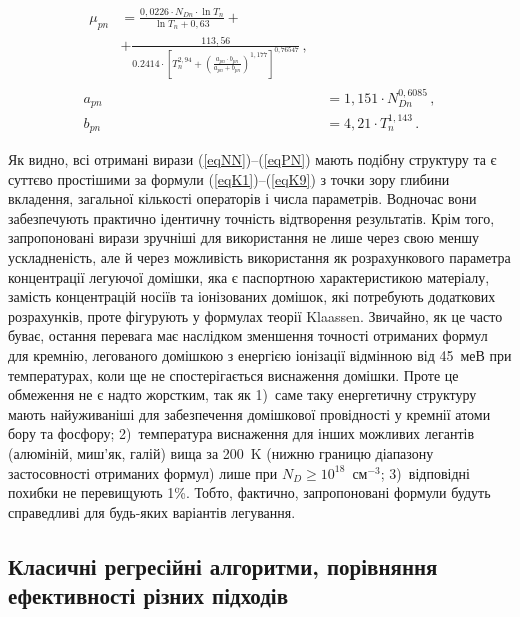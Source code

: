 \documentclass[fleqn,twoside,twocolumn,nofootinbib,showkeys]{revtex4} %
\begin{document}
\begin{subequations} \label{eqPN}
    \begin{align}
     \begin{split}
      \mu_{pn}& =\frac{0,0226\cdot N_{Dn}\cdot\ln T_n}{\ln T_n+0,63}+\\
      &+\frac{113,56}{0.2414\!\cdot\!\left[T_n^{2,94}+\left(\frac{a_{pn}\cdot b_{pn}}{a_{pn}+ b_{pn}}\right)^{1,177}\right]^{0,76547}}\,, \label{eqPNa}
     \end{split}\\
      a_{pn} &=1,151\cdot N_{Dn}^{0,6085}\,, \label{eqPNb} \\
      b_{pn}& =4,21\cdot T_n^{1,143}\,. \label{eqPNc}
    \end{align}
\end{subequations}


Як видно, всі отримані вирази (\ref{eqNN})–(\ref{eqPN}) мають подібну структуру
та є суттєво простішими за формули (\ref{eqK1})–(\ref{eqK9}) з точки зору глибини вкладення, загальної кількості операторів і числа параметрів.
Водночас вони забезпечують практично ідентичну точність відтворення результатів.
Крім того, запропоновані вирази зручніші для використання не лише через свою меншу ускладненість,
але й через можливість використання як розрахункового параметра концентрації легуючої домішки, яка є паспортною характеристикою матеріалу,
замість концентрацій носіїв та іонізованих домішок, які потребують додаткових розрахунків, проте фігурують у формулах теорії Klaassen.
Звичайно, як це часто буває, остання перевага має наслідком зменшення точності отриманих формул для кремнію,
легованого домішкою з енергією іонізації відмінною від 45~меВ при температурах, коли ще не спостерігається виснаження домішки.
Проте це обмеження не є надто жорстким, так як
1)~саме таку енергетичну структуру мають найуживаніші для забезпечення домішкової провідності у кремнії атоми бору та фосфору;
2)~температура виснаження для інших можливих легантів (алюміній, миш'як, галій) вища за 200~K
(нижню границю діапазону застосовності отриманих формул) лише при $N_D\geq10^{18}$~см$^{-3}$;
3)~відповідні похибки не перевищують 1\%.
Тобто, фактично, запропоновані формули  будуть справедливі для будь-яких варіантів легування.

\subsection{Класичні регресійні алгоритми, порівняння ефективності різних підходів}
\end{document}
